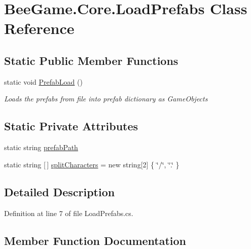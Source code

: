 \hypertarget{class_bee_game_1_1_core_1_1_load_prefabs}{}\section{Bee\+Game.\+Core.\+Load\+Prefabs Class Reference}
\label{class_bee_game_1_1_core_1_1_load_prefabs}
\subsection*{Static Public Member Functions}
\begin{DoxyCompactItemize}
\item 
static void \hyperlink{class_bee_game_1_1_core_1_1_load_prefabs_ae6045dba0f7f8bad5a1256ff46747614}{Prefab\+Load} ()
\begin{DoxyCompactList}\small\item\em Loads the prefabs from file into prefab dictionary as Game\+Objects \end{DoxyCompactList}\end{DoxyCompactItemize}
\subsection*{Static Private Attributes}
\begin{DoxyCompactItemize}
\item 
static string \hyperlink{class_bee_game_1_1_core_1_1_load_prefabs_a0f61e1d478ea8953fc4cfa5fa4a59b90}{prefab\+Path}
\item 
static string \mbox{[}$\,$\mbox{]} \hyperlink{class_bee_game_1_1_core_1_1_load_prefabs_a774463c4978def7fe0052c4ed1b46549}{split\+Characters} = new string\mbox{[}2\mbox{]} \{ \char`\"{}/\char`\"{}, \char`\"{}.\char`\"{} \}
\end{DoxyCompactItemize}


\subsection{Detailed Description}


Definition at line 7 of file Load\+Prefabs.\+cs.



\subsection{Member Function Documentation}
\mbox{\label{class_bee_game_1_1_core_1_1_load_prefabs_ae6045dba0f7f8bad5a1256ff46747614}} 

